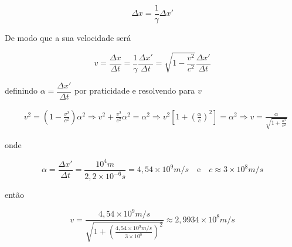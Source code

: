 \documentclass[10pt,a4paper]{article}
\begin{document}
	\begin{equation*}
		\Delta x = \frac{1}{\gamma}\Delta x'
	\end{equation*}
	
	
	De modo que a sua velocidade será 
	
	\begin{equation*}
		v = \frac{\Delta x}{\Delta t} = \frac{1}{\gamma}\frac{\Delta x'}{\Delta t} = \sqrt{1-\frac{v^2}{c^2}}\frac{\Delta x'}{\Delta t} 
	\end{equation*}
	
	definindo $\alpha = \dfrac{\Delta x'}{\Delta t}$ por praticidade e resolvendo para \(v\)
	
	\begin{equation*}
		\begin{split}
			&v^2 = \left(1 -\frac{v^2}{c^2}\right)\alpha^2 \Rightarrow v^2 + \frac{v^2}{c^2}\alpha^2 = \alpha^2 \Rightarrow v^2\left[1 + \left(\frac{\alpha}{c}\right)^2\right] = \alpha^2 \Rightarrow v = \frac{\alpha}{\sqrt{1+\frac{\alpha^2}{c^2}}}
		\end{split}
	\end{equation*}
	
	onde 
	
	\begin{equation}\nonumber
		\alpha = \frac{\Delta x'}{\Delta t} = \frac{10^4 \si{m}}{2,2\times 10^{-6}\si{s}} = 4,54\times 10^9\si{m/s} \quad \text{e} \quad c\approx 3\times 10^8\si{m/s}
	\end{equation}
	
	então
	
	\begin{equation}\nonumber
		v = \frac{4,54\times 10^9\si{m/s}}{\sqrt{1+\left(\frac{4,54\times 10^9\si{m/s}}{3\times 10^8}\right)^2}} \approx 2,9934 \times 10^8 \si{m/s} 
	\end{equation}
\end{document}
